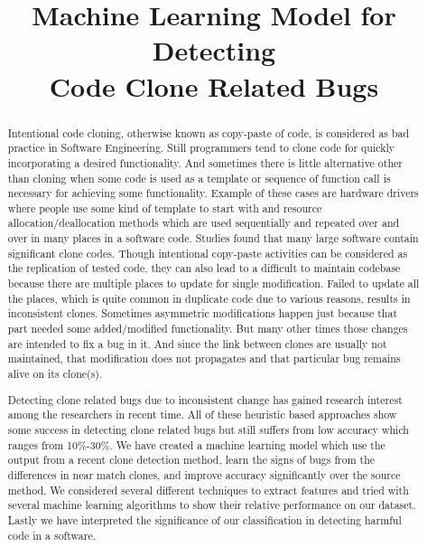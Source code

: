\documentclass[nocopyrightspace]{sigplanconf}
\title{Machine Learning Model for Detecting \\Code Clone Related Bugs}
\date{}
\begin{document}
\maketitle

\begin{abstract}
Intentional code cloning, otherwise known as copy-paste of code, is considered as bad practice in Software Engineering. Still programmers tend to clone code for quickly incorporating a desired functionality. And sometimes there is little alternative other than cloning when some code is used as a template or sequence of function call is necessary for achieving some functionality. Example of these cases are hardware drivers where people use some kind of template to start with and resource allocation/deallocation methods which are used sequentially and repeated over and over in many places in a software code. Studies found that many large software contain significant clone codes. Though intentional copy-paste activities can be considered as the replication of tested code, they can also lead to a difficult to maintain codebase because there are multiple places to update for single modification. Failed to update all the places, which is quite common in duplicate code due to various reasons, results in inconsistent clones. Sometimes asymmetric modifications happen just because that part needed some added/modified functionality. But many other times those changes are intended to fix a bug in it. And since the link between clones are usually not maintained, that modification does not propagates and that particular bug remains alive on its clone(s).

Detecting clone related bugs due to inconsistent change has gained research interest among the researchers in recent time. All of these heuristic based approaches show some success in detecting clone related bugs but still suffers from low accuracy which ranges from 10\%-30\%. We have created a machine learning model which use the output from a recent clone detection method, learn the signs of bugs from the differences in near match clones, and improve accuracy significantly over the source method. We considered several different techniques to extract features and tried with several machine learning algorithms to show their relative performance on our dataset. Lastly we have interpreted the significance of our classification in detecting harmful code in a software.\end{abstract}
			
\end{document}
